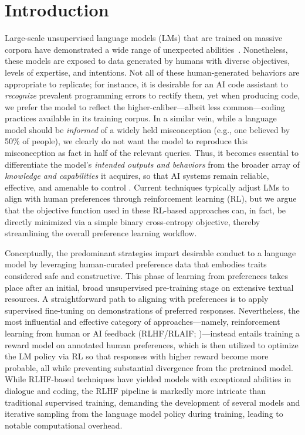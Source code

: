 \section{Introduction}
Large-scale unsupervised language models (LMs) that are trained on massive corpora have demonstrated a wide range of unexpected abilities~\citep{chowdhery2022palm, brown2020language, touvron2023llama,bubeck2023sparks}. Nonetheless, these models are exposed to data generated by humans with diverse objectives, levels of expertise, and intentions. Not all of these human-generated behaviors are appropriate to replicate; for instance, it is desirable for an AI code assistant to \textit{recognize} prevalent programming errors to rectify them, yet when producing code, we prefer the model to reflect the higher-caliber—albeit less common—coding practices available in its training corpus. In a similar vein, while a language model should be \textit{informed} of a widely held misconception (e.g., one believed by 50\% of people), we clearly do not want the model to reproduce this misconception as fact in half of the relevant queries. Thus, it becomes essential to differentiate the model’s \emph{intended outputs and behaviors} from the broader array of \textit{knowledge and capabilities} it acquires, so that AI systems remain reliable, effective, and amenable to control \citep{ouyang2022training}. Current techniques typically adjust LMs to align with human preferences through reinforcement learning (RL), but we argue that the objective function used in these RL-based approaches can, in fact, be directly minimized via a simple binary cross-entropy objective, thereby streamlining the overall preference learning workflow.

Conceptually, the predominant strategies impart desirable conduct to a language model by leveraging human-curated preference data that embodies traits considered safe and constructive. This phase of learning from preferences takes place after an initial, broad unsupervised pre-training stage on extensive textual resources. A straightforward path to aligning with preferences is to apply supervised fine-tuning on demonstrations of preferred responses. Nevertheless, the most influential and effective category of approaches—namely, reinforcement learning from human or AI feedback (RLHF/RLAIF; \citep{christiano2017deep,bai2022constitutional})—instead entails training a reward model on annotated human preferences, which is then utilized to optimize the LM policy via RL so that responses with higher reward become more probable, all while preventing substantial divergence from the pretrained model. While RLHF-based techniques have yielded models with exceptional abilities in dialogue and coding, the RLHF pipeline is markedly more intricate than traditional supervised training, demanding the development of several models and iterative sampling from the language model policy during training, leading to notable computational overhead.


